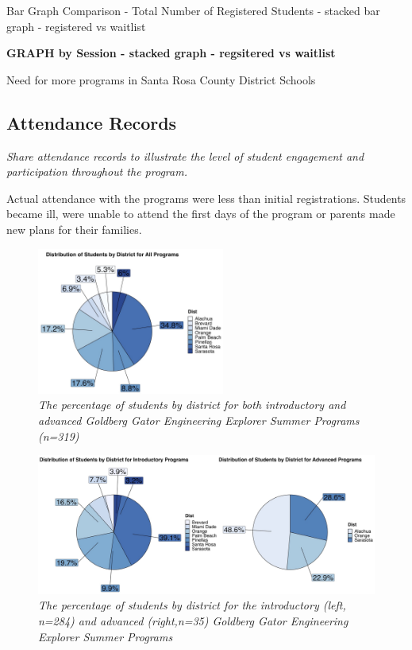 \documentclass[
]{article}
\begin{document}
Bar Graph Comparison - Total Number of Registered Students - stacked bar
graph - registered vs waitlist

\textbf{GRAPH by Session - stacked graph - regsitered vs waitlist}

Need for more programs in Santa Rosa County District Schools

\hypertarget{attendance-records}{%
\subsection{Attendance Records}\label{attendance-records}}

\emph{Share attendance records to illustrate the level of student
engagement and participation throughout the program.}

Actual attendance with the programs were less than initial
registrations. Students became ill, were unable to attend the first days
of the program or parents made new plans for their families.

\begin{figure}
\centering
\includegraphics[width=0.55\textwidth,height=\textheight]{Graphs/Report/GGEE_23_District_All.jpg}
\caption{\emph{The percentage of students by district for both
introductory and advanced Goldberg Gator Engineering Explorer Summer
Programs (n=319)}}
\end{figure}

\begin{figure}
\centering
\includegraphics{Graphs/Report/GGEE_23_District_IA.jpg}
\caption{\emph{The percentage of students by district for the
introductory (left, n=284) and advanced (right,n=35) Goldberg Gator
Engineering Explorer Summer Programs}}
\end{figure}
\end{document}

